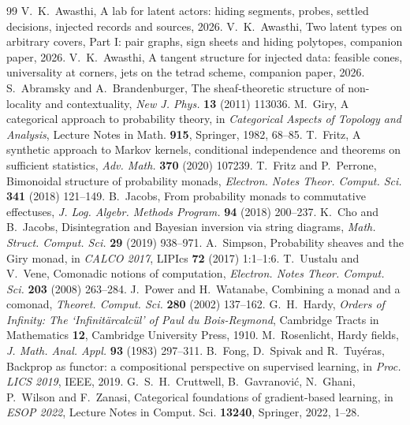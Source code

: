 \documentclass[11pt]{article}
\theoremstyle{definition}\newtheorem{definition}[theorem]{Definition}\newtheorem{remark}[theorem]{Remark}\newtheorem{example}[theorem]{Example}
\begin{document}
\begin{thebibliography}{99}
 V.~K.~Awasthi, A lab for latent actors: hiding segments, probes, settled decisions, injected records and sources, 2026.
 V.~K.~Awasthi, Two latent types on arbitrary covers, Part I: pair graphs, sign sheets and hiding polytopes, companion paper, 2026.
 V.~K.~Awasthi, A tangent structure for injected data: feasible cones, universality at corners, jets on the tetrad scheme, companion paper, 2026.
 S.~Abramsky and A.~Brandenburger, The sheaf-theoretic structure of non-locality and contextuality, \emph{New J. Phys.} \textbf{13} (2011) 113036.
 M.~Giry, A categorical approach to probability theory, in \emph{Categorical Aspects of Topology and Analysis}, Lecture Notes in Math. \textbf{915}, Springer, 1982, 68--85.
 T.~Fritz, A synthetic approach to Markov kernels, conditional independence and theorems on sufficient statistics, \emph{Adv. Math.} \textbf{370} (2020) 107239.
 T.~Fritz and P.~Perrone, Bimonoidal structure of probability monads, \emph{Electron. Notes Theor. Comput. Sci.} \textbf{341} (2018) 121--149.
 B.~Jacobs, From probability monads to commutative effectuses, \emph{J. Log. Algebr. Methods Program.} \textbf{94} (2018) 200--237.
 K.~Cho and B.~Jacobs, Disintegration and Bayesian inversion via string diagrams, \emph{Math. Struct. Comput. Sci.} \textbf{29} (2019) 938--971.
 A.~Simpson, Probability sheaves and the Giry monad, in \emph{CALCO 2017}, LIPIcs \textbf{72} (2017) 1:1--1:6.
 T.~Uustalu and V.~Vene, Comonadic notions of computation, \emph{Electron. Notes Theor. Comput. Sci.} \textbf{203} (2008) 263--284.
 J.~Power and H.~Watanabe, Combining a monad and a comonad, \emph{Theoret. Comput. Sci.} \textbf{280} (2002) 137--162.
 G.~H.~Hardy, \emph{Orders of Infinity: The `Infinit\"arcalc\"ul' of Paul du Bois-Reymond}, Cambridge Tracts in Mathematics \textbf{12}, Cambridge University Press, 1910.
 M.~Rosenlicht, Hardy fields, \emph{J. Math. Anal. Appl.} \textbf{93} (1983) 297--311.
 B.~Fong, D.~Spivak and R.~Tuy\'eras, Backprop as functor: a compositional perspective on supervised learning, in \emph{Proc. LICS 2019}, IEEE, 2019.
 G.~S.~H.~Cruttwell, B.~Gavranovi\'c, N.~Ghani, P.~Wilson and F.~Zanasi, Categorical foundations of gradient-based learning, in \emph{ESOP 2022}, Lecture Notes in Comput. Sci. \textbf{13240}, Springer, 2022, 1--28.

\end{thebibliography}
\end{document}
